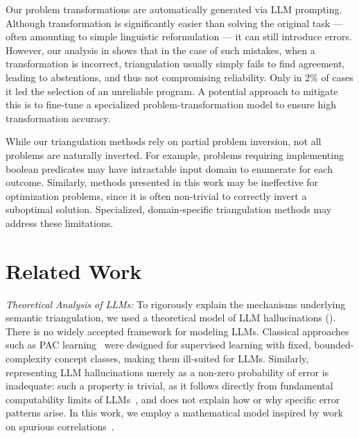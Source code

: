 \documentclass[acmsmall,screen,nonacm]{acmart}
\begin{document}
Our problem transformations are automatically generated via LLM prompting. Although transformation is significantly easier than solving the original task --- often amounting to simple linguistic reformulation --- it can still introduce errors. However, our analysis in  shows that in the case of such mistakes, when a transformation is incorrect, triangulation usually simply fails to find agreement, leading to abstentions, and thus not compromising reliability. Only in 2\% of cases it led the selection of an unreliable program. A potential approach to mitigate this is to fine-tune a specialized problem-transformation model to ensure high transformation accuracy.

While our triangulation methods rely on partial problem inversion, not all problems are naturally inverted. For example, problems requiring implementing boolean predicates may have intractable input domain to enumerate for each outcome. Similarly, methods presented in this work may be ineffective for optimization problems, since it is often non-trivial to correctly invert a suboptimal solution. Specialized, domain-specific triangulation methods may address these limitations.


\section{Related Work}

\textit{Theoretical Analysis of LLMs:} To rigorously explain the mechanisms underlying semantic triangulation, we used a theoretical model of LLM hallucinations (). There is no widely accepted framework for modeling LLMs. Classical approaches such as PAC learning~\cite{valiant2013probably} were designed for supervised learning with fixed, bounded-complexity concept classes, making them ill-suited for LLMs. Similarly, representing LLM hallucinations merely as a non-zero probability of error is inadequate: such a property is trivial, as it follows directly from fundamental computability limits of LLMs~\cite{suzuki2025hallucinations, xu2024hallucination}, and does not explain how or why specific error patterns arise. In this work, we employ a mathematical model inspired by work on spurious correlations~\cite{ye2024spurious}.
\end{document}
